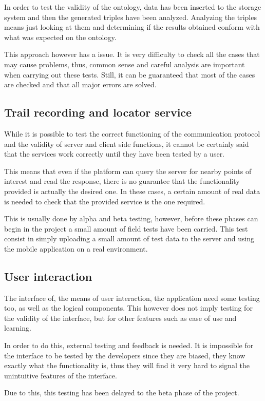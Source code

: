 In order to test the validity of the ontology, data has been inserted to the storage system and then the generated triples have been analyzed. Analyzing the triples means just looking at them and determining if the results obtained conform with what was expected on the ontology.

This approach however has a issue. It is very difficulty to check all the cases that may cause problems, thus, common sense and careful analysis are important when carrying out these tests. Still, it can be guaranteed that most of the cases are checked and that all major errors are solved. 

\subsection{Trail recording and locator service}

While it is possible to test the correct functioning of the communication protocol and the validity of server and client side functions, it cannot be certainly said that the services work correctly until they have been tested by a user.

This means that even if the platform can query the server for nearby points of interest and read the response, there is no guarantee that the functionality provided is actually the desired one. In these cases, a certain amount of real data is needed to check that the provided service is the one required.

This is usually done by alpha and beta testing, however, before these phases can begin in the project a small amount of field tests have been carried. This test consist in simply uploading a small amount of test data to the server and using the mobile application on a real environment.

\subsection{User interaction}

The interface of, the means of user interaction, the application need some testing too, as well as the logical components. This however does not imply testing for the validity of the interface, but for other features such as ease of use and learning.

In order to do this, external testing and feedback is needed. It is impossible for the interface to be tested by the developers since they are biased, they know exactly what the functionality is, thus they will find it very hard to signal the unintuitive features of the interface.

Due to this, this testing has been delayed to the beta phase of the project.